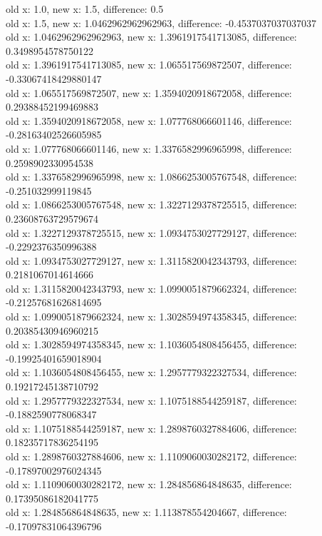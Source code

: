 \documentclass[12pt]{article}
\begin{document}
\begin{enumerate}
\begin{footnotesize}
\begin{spacing}{-.8}
old x: 1.0, new x: 1.5, difference: 0.5\\
old x: 1.5, new x: 1.0462962962962963, difference: -0.4537037037037037\\
old x: 1.0462962962962963, new x: 1.3961917541713085, difference: 0.3498954578750122\\
old x: 1.3961917541713085, new x: 1.065517569872507, difference: -0.33067418429880147\\
old x: 1.065517569872507, new x: 1.3594020918672058, difference: 0.29388452199469883\\
old x: 1.3594020918672058, new x: 1.077768066601146, difference: -0.28163402526605985\\
old x: 1.077768066601146, new x: 1.3376582996965998, difference: 0.2598902330954538\\
old x: 1.3376582996965998, new x: 1.0866253005767548, difference: -0.251032999119845\\
old x: 1.0866253005767548, new x: 1.3227129378725515, difference: 0.23608763729579674\\
old x: 1.3227129378725515, new x: 1.0934753027729127, difference: -0.2292376350996388\\
old x: 1.0934753027729127, new x: 1.3115820042343793, difference: 0.2181067014614666\\
old x: 1.3115820042343793, new x: 1.0990051879662324, difference: -0.21257681626814695\\
old x: 1.0990051879662324, new x: 1.3028594974358345, difference: 0.20385430946960215\\
old x: 1.3028594974358345, new x: 1.1036054808456455, difference: -0.19925401659018904\\
old x: 1.1036054808456455, new x: 1.2957779322327534, difference: 0.19217245138710792\\
old x: 1.2957779322327534, new x: 1.1075188544259187, difference: -0.1882590778068347\\
old x: 1.1075188544259187, new x: 1.2898760327884606, difference: 0.18235717836254195\\
old x: 1.2898760327884606, new x: 1.1109060030282172, difference: -0.17897002976024345\\
old x: 1.1109060030282172, new x: 1.284856864848635, difference: 0.17395086182041775\\
old x: 1.284856864848635, new x: 1.113878554204667, difference: -0.17097831064396796\\

\end{spacing}
\end{footnotesize}
\end{enumerate}
\end{document}
